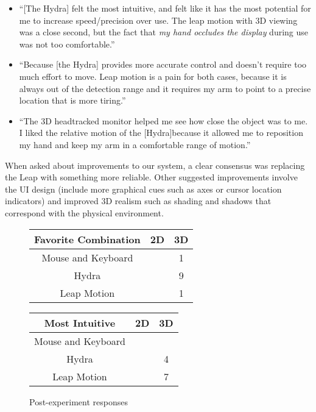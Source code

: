 \begin{itemize}
\item ``[The Hydra] felt the most intuitive, and felt like it has the most
  potential for me to increase speed/precision over use.  The leap motion with
  3D viewing was a close second, but the fact that \emph{my hand occludes the
  display} during use was not too comfortable.''
\item ``Because [the Hydra] provides more accurate control and doesn't require
  too much effort to move. Leap motion is a pain for both cases, because it is
  always out of the detection range and it requires my arm to point to a
  precise location that is more tiring.''
\item ``The 3D headtracked monitor helped me see how close the object was to
  me. I liked the relative motion of the [Hydra]because it allowed me to
  reposition my hand and keep my arm in a comfortable range of motion.''
\end{itemize}

When asked about improvements to our system, a clear consensus was replacing
the Leap with something more reliable.  Other suggested improvements involve
the UI design (include more graphical cues such as axes or cursor location
indicators) and improved 3D realism such as shading and shadows that
correspond with the physical environment.

\begin{figure}
    \centering
    \begin{tabular}{c | c | c}
    Favorite Combination & 2D & 3D \\ \hline
    Mouse and Keyboard   &    & 1 \\
    Hydra                &    & 9 \\
    Leap Motion          &    & 1 \\
    \end{tabular}

    \vspace{0.2in}

    \begin{tabular}{c | c | c}
    Most Intuitive     & 2D & 3D \\ \hline
    Mouse and Keyboard &    &  \\
    Hydra              &    & 4 \\
    Leap Motion        &    & 7 \\
    \end{tabular}

    \caption{Post-experiment responses}
    \label{fig:post}
\end{figure}

